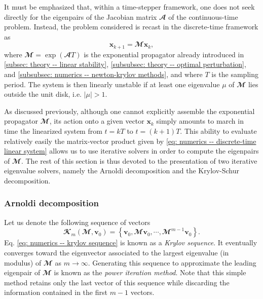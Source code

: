   It must be emphasized that, within a time-stepper framework, one does not seek directly for the eigenpairs of the Jacobian matrix $\mathbfcal{A}$ of the continuous-time problem. Instead, the problem considered is recast in the discrete-time framework as
  \begin{equation}
    \mathbf{x}_{k+1} = \mathbfcal{M} \mathbf{x}_k,
    \label{eq: numerics -- discrete-time linear system}
  \end{equation}
  where $\mathbfcal{M} = \exp \left( \mathbfcal{A} T \right)$ is the exponential propagator already introduced in \textsection \ref{subsec: theory -- linear stability}, \textsection \ref{subsubsec: theory -- optimal perturbation}, and \textsection \ref{subsubsec: numerics -- newton-krylov methods}, and where $T$ is the sampling period. The system is then linearly unstable if at least one eigenvalue $\mu$ of $\mathbfcal{M}$ lies outside the unit disk, i.e. $\vert \mu \vert > 1$.

  As discussed previously, although one cannot explicitly assemble the exponential propagator $\mathbfcal{M}$, its action onto a given vector $\mathbf{x}_k$ simply amounts to march in time the linearized system from $t = kT$ to $t = (k+1)T$. This ability to evaluate relatively easily the matrix-vector product given by \eqref{eq: numerics -- discrete-time linear system} allows us to use iterative solvers in order to compute the eigenpairs of $\mathbfcal{M}$. The rest of this section is thus devoted to the presentation of two iterative eigenvalue solvers, namely the Arnoldi decomposition and the Krylov-Schur decomposition.

    \subsubsection{Arnoldi decomposition}
    \label{subsubsec: numerics -- arnoldi}

    Let us denote the following sequence of vectors
    \begin{equation}
      \mathbfcal{K}_m\left( \mathbfcal{M}, \mathbf{v}_0 \right) = \left\{ \mathbf{v}_0, \mathbfcal{M}\mathbf{v}_0, \cdots, \mathbfcal{M}^{m-1} \mathbf{v}_0 \right\}.
      \label{eq: numerics -- krylov sequence}
    \end{equation}
    Eq. \eqref{eq: numerics -- krylov sequence} is known as a \emph{Krylov sequence}. It eventually converges toward the eigenvector associated to the largest eigenvalue (in modulus) of $\mathbfcal{M}$ as $m \to \infty$. Generating this sequence to approximate the leading eigenpair of $\mathbfcal{M}$ is known as the \emph{power iteration method}. Note that this simple method retains only the last vector of this sequence while discarding the information contained in the first $m-1$ vectors.

